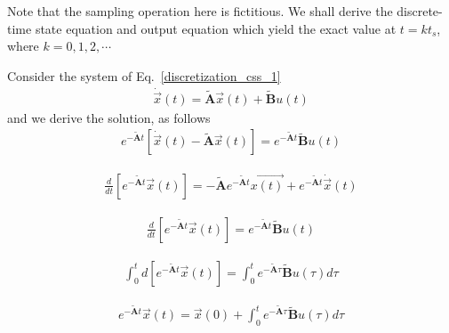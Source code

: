 \documentclass[12pt,a4paper,oneside]{book}
\begin{document}
\begin{onehalfspace}
Note that the sampling operation here is fictitious. We shall derive the 
discrete-time state equation and output equation which yield the exact value at 
$t = kt_s$, where $k=0,1,2,\cdots$

Consider the system of Eq.~\eqref{discretization_css_1}
\begin{equation}\label{discretization_css_1}
	\begin{aligned}
		\dot{\vec{x}}(t) = \tilde{\mathbf{A}} \vec{x}(t) + \tilde{\mathbf{B}}u(t)
	\end{aligned}
\end{equation}
and we derive the solution, as follows
\begin{equation}\label{discretization_css_2}
	\begin{aligned}
		e^{-\tilde{\mathbf{A}}t}\left[  \dot{\vec{x}}(t) - \tilde{\mathbf{A}} \vec{x}(t) \right] = e^{-\tilde{\mathbf{A}}t} \tilde{\mathbf{B}}u(t)
	\end{aligned}
\end{equation}

\begin{equation}\label{discretization_css_3}
	\begin{aligned}
		\frac{d}{dt}\left[ e^{-\tilde{\mathbf{A}}t} \vec{x}(t) \right] =  -\tilde{\mathbf{A}}e^{-\tilde{\mathbf{A}}t}\vec{x(t)} + e^{-\tilde{\mathbf{A}}t} \dot{\vec{x}}(t)
	\end{aligned}
\end{equation}

\begin{equation}\label{discretization_css_4}
	\begin{aligned}
		\frac{d}{dt}\left[ e^{-\tilde{\mathbf{A}}t} \vec{x}(t) \right] =  e^{-\tilde{\mathbf{A}}t} \tilde{\mathbf{B}}u(t)
	\end{aligned}
\end{equation}

\begin{equation}\label{discretization_css_5}
	\begin{aligned}
		\int_{0}^{t}d\left[ e^{-\tilde{\mathbf{A}}t} \vec{x}(t) \right] = \int_{0}^{t}e^{-\tilde{\mathbf{A}}\tau} \tilde{\mathbf{B}}u(\tau)d\tau
	\end{aligned}
\end{equation}

\begin{equation}\label{discretization_css_6}
	\begin{aligned}
		e^{-\tilde{\mathbf{A}}t} \vec{x}(t) = \vec{x}(0) + \int_{0}^{t}e^{-\tilde{\mathbf{A}}\tau} \tilde{\mathbf{B}}u(\tau)d\tau
	\end{aligned}
\end{equation}


\end{onehalfspace}
\end{document}

